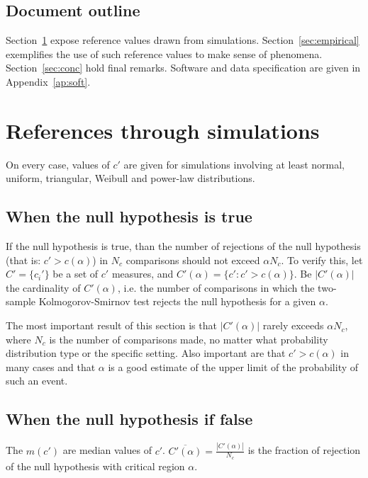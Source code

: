 \documentclass[%
	aip,
	jmp,%
	amsmath,amssymb,
	reprint,%
]{revtex4-1}
\begin{document}
\subsection{Document outline}
Section~\ref{sec:simulations} expose reference values drawn from simulations.
Section~\ref{sec:empirical} exemplifies the use of such reference values
to make sense of phenomena.
Section~\ref{sec:conc} hold final remarks.
Software and data specification are given in Appendix~\ref{ap:soft}.


\section{References through simulations}\label{sec:simulations}
On every case, values of $c'$ are given for simulations involving
at least normal, uniform, triangular, Weibull and power-law distributions.

\subsection{When the null hypothesis is true}
If the null hypothesis is true, than the number
of rejections of the null hypothesis (that is: $c'>c(\alpha)$)
in $N_c$ comparisons should not exceed $\alpha N_c$.
To verify this, let $C'=\{c_i'\}$ be a set of $c'$ measures,
and $C'(\alpha)=\{c' : c'>c(\alpha)\}$.
Be $|C'(\alpha)|$ the cardinality of $C'(\alpha)$,
i.e. the number of comparisons in which the two-sample Kolmogorov-Smirnov
test rejects the null hypothesis for a given $\alpha$.

The most important result of this section is that
$|C'(\alpha)|$ rarely exceeds $\alpha N_c$,
 where $N_c$ is the number of comparisons made,
no matter what probability distribution type
or the specific setting.
Also important are that
$c'>c(\alpha)$ in many cases
and that $\alpha$ is a good estimate of the upper limit of the probability
of such an event.






\subsection{When the null hypothesis if false}
The $m(c')$ are median values of $c'$.
$\overline{C'(\alpha)}=\frac{|C'(\alpha)|}{N_c}$ is the fraction
of rejection of the null hypothesis with critical region $\alpha$.






%
%
\end{document}
